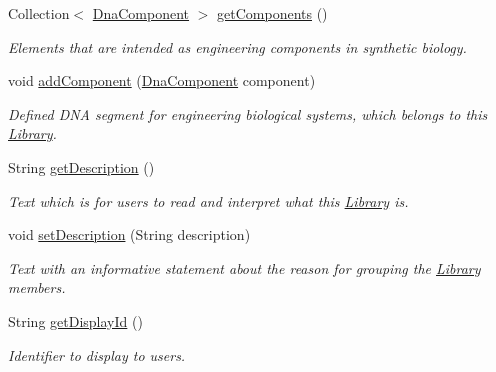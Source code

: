\begin{DoxyCompactItemize}
\item 
Collection$<$ \hyperlink{classorg_1_1sbolstandard_1_1lib_s_b_o_lj_1_1_dna_component}{DnaComponent} $>$ \hyperlink{classorg_1_1sbolstandard_1_1lib_s_b_o_lj_1_1_library_a45382b83b645ea4b89393c96023c54ba}{getComponents} ()
\begin{DoxyCompactList}\small\item\em Elements that are intended as engineering components in synthetic biology. \item\end{DoxyCompactList}\item 
void \hyperlink{classorg_1_1sbolstandard_1_1lib_s_b_o_lj_1_1_library_a9ff983431034c861c97db6aeeecfa9c9}{addComponent} (\hyperlink{classorg_1_1sbolstandard_1_1lib_s_b_o_lj_1_1_dna_component}{DnaComponent} component)
\begin{DoxyCompactList}\small\item\em Defined DNA segment for engineering biological systems, which belongs to this \hyperlink{classorg_1_1sbolstandard_1_1lib_s_b_o_lj_1_1_library}{Library}. \item\end{DoxyCompactList}\item 
String \hyperlink{classorg_1_1sbolstandard_1_1lib_s_b_o_lj_1_1_library_ac7feffb7a33f63504ff1f87f19e2d2d8}{getDescription} ()
\begin{DoxyCompactList}\small\item\em Text which is for users to read and interpret what this \hyperlink{classorg_1_1sbolstandard_1_1lib_s_b_o_lj_1_1_library}{Library} is. \item\end{DoxyCompactList}\item 
void \hyperlink{classorg_1_1sbolstandard_1_1lib_s_b_o_lj_1_1_library_a1d15d718177c4f5411ce6ab339889fd4}{setDescription} (String description)
\begin{DoxyCompactList}\small\item\em Text with an informative statement about the reason for grouping the \hyperlink{classorg_1_1sbolstandard_1_1lib_s_b_o_lj_1_1_library}{Library} members. \item\end{DoxyCompactList}\item 
String \hyperlink{classorg_1_1sbolstandard_1_1lib_s_b_o_lj_1_1_library_aefe76199cb4d0096f487b280c411d843}{getDisplayId} ()
\begin{DoxyCompactList}\small\item\em Identifier to display to users. \item\end{DoxyCompactList}\item 

\end{DoxyCompactItemize}
